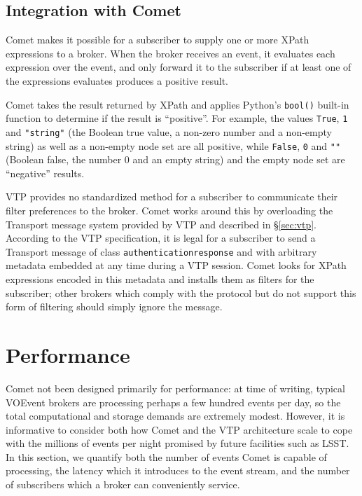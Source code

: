 \documentclass[5p,authoryear]{elsarticle}
\begin{document}
\subsection{Integration with Comet}

Comet makes it possible for a subscriber to supply one or more XPath
expressions to a broker. When the broker receives an event, it evaluates each
expression over the event, and only forward it to the subscriber if at least
one of the expressions evaluates produces a positive result.

Comet takes the result returned by XPath and applies Python's \texttt{bool()}
built-in function to determine if the result is ``positive''. For example, the
values \texttt{True}, \texttt{1} and \texttt{"string"} (the Boolean true
value, a non-zero number and a non-empty string) as well as a non-empty node
set are all positive, while \texttt{False}, \texttt{0} and \texttt{""}
(Boolean false, the number 0 and an empty string) and the empty node set are
``negative'' results.

VTP provides no standardized method for a subscriber to communicate their
filter preferences to the broker. Comet works around this by overloading the
Transport message system provided by VTP and described in \S\ref{sec:vtp}.
According to the VTP specification, it is legal for a subscriber to send a
Transport message of class \texttt{authenticationresponse} and with arbitrary
metadata embedded at any time during a VTP session. Comet looks for XPath
expressions encoded in this metadata and installs them as filters for the
subscriber; other brokers which comply with the protocol but do not support
this form of filtering should simply ignore the message.

\section{Performance}
\label{sec:perf}

Comet not been designed primarily for performance: at time of writing, typical
VOEvent brokers are processing perhaps a few hundred events per day, so the
total computational and storage demands are extremely modest. However, it is
informative to consider both how Comet and the VTP architecture scale to cope
with the millions of events per night promised by future facilities such as
LSST. In this section, we quantify both the number of events Comet is capable
of processing, the latency which it introduces to the event stream, and the
number of subscribers which a broker can conveniently service.
\end{document}
